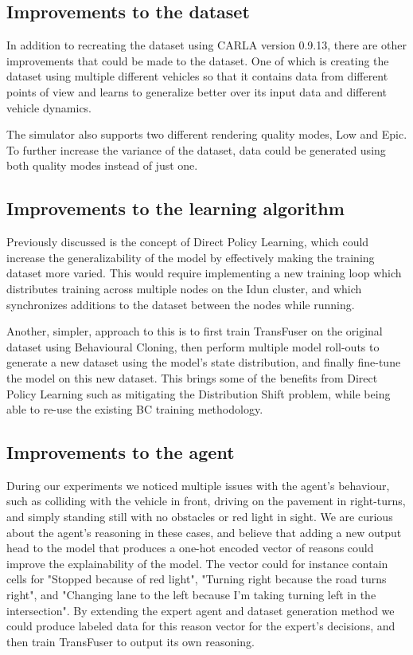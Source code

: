 \subsection{Improvements to the dataset}

In addition to recreating the dataset using CARLA version 0.9.13,
there are other improvements that could be made to the dataset.
One of which is creating the dataset using multiple different vehicles
so that it contains data from different points of view
and learns to generalize better over its input data and different vehicle dynamics.

The simulator also supports two different rendering quality modes, Low and Epic.
To further increase the variance of the dataset,
data could be generated using both quality modes instead of just one.


\subsection{Improvements to the learning algorithm}

Previously discussed is the concept of Direct Policy Learning,
which could increase the generalizability of the model
by effectively making the training dataset more varied.
This would require implementing a new training loop which distributes
training across multiple nodes on the Idun cluster,
and which synchronizes additions to the dataset between the nodes while running.

Another, simpler, approach to this is to first train TransFuser on the original dataset using Behavioural Cloning,
then perform multiple model roll-outs to generate a new dataset using the model's state distribution,
and finally fine-tune the model on this new dataset.
This brings some of the benefits from Direct Policy Learning such as mitigating the Distribution Shift problem,
while being able to re-use the existing BC training methodology.


\subsection{Improvements to the agent}

During our experiments we noticed multiple issues with the agent's behaviour,
such as colliding with the vehicle in front,
driving on the pavement in right-turns,
and simply standing still with no obstacles or red light in sight.
We are curious about the agent's reasoning in these cases,
and believe that adding a new output head to the model that produces a one-hot encoded vector of reasons
could improve the explainability of the model.
The vector could for instance contain cells for
"Stopped because of red light",
"Turning right because the road turns right",
and "Changing lane to the left because I'm taking turning left in the intersection".
By extending the expert agent and dataset generation method
we could produce labeled data for this reason vector for the expert's decisions,
and then train TransFuser to output its own reasoning.


